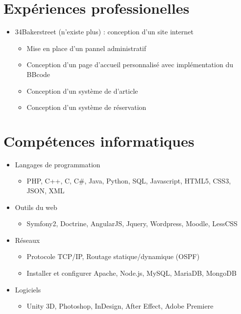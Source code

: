 \documentclass[a4paper]{article}
\begin{document}
\section{Expériences professionelles}
    \begin{itemize}
        \item 34Bakerstreet (n'existe plus) : conception d'un site internet
        \begin{itemize}
            \item Mise en place d'un pannel administratif
            \item Conception d'un page d'accueil personnalisé avec implémentation du BBcode
            \item Conception d'un système de d'article
            \item Conception d'un système de réservation
        \end{itemize}
    \end{itemize}

\section*{Compétences informatiques}
    \begin{itemize}
        \item Langages de programmation
        \begin{itemize}
            \item PHP, C++, C, C\#, Java, Python, SQL, Javascript, HTML5, CSS3, JSON, XML
        \end{itemize}
        \item Outils du web
        \begin{itemize}
            \item Symfony2, Doctrine, AngularJS, Jquery, Wordpress, Moodle, LessCSS
        \end{itemize}
        \item Réseaux
        \begin{itemize}
            \item Protocole TCP/IP, Routage statique/dynamique (OSPF)
            \item Installer et configurer Apache, Node.js, MySQL, MariaDB, MongoDB
        \end{itemize}
        \item Logiciels
        \begin{itemize}
            \item Unity 3D, Photoshop, InDesign, After Effect, Adobe Premiere
        \end{itemize}
    \end{itemize}
\end{document}
